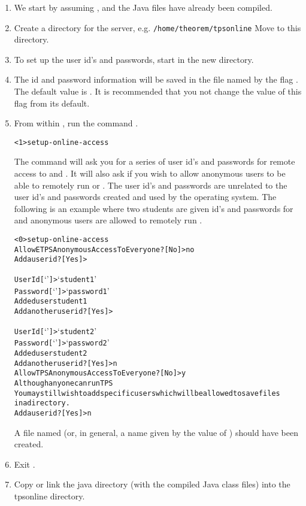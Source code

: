 \begin{enumerate}
\item We start by assuming {\ETPS}, {\TPS} and the Java files
have already been compiled.

\item Create a directory for the server, e.g.
{\tt /home/theorem/tpsonline}
Move to this directory.

\item To set up the user id's and passwords, start {\TPS}
in the new directory.

\item The id and password information will be saved in the file named by
the flag .  The default value
is .  It is recommended that
you not change the value of this flag from its default.

\item From within {\TPS}, run the command .
\begin{alltt}
<1>setup-online-access
\end{alltt}
The command  will ask you for
a series of user id's and passwords for remote access
to {\TPS} and {\ETPS}.  It will also ask if you
wish to allow anonymous users to be able to remotely run {\TPS} or {\ETPS}.
The user id's and passwords
are unrelated to the user id's and passwords created and used by the operating
system.  The following is an example where two students are given
id's and passwords for {\ETPS} and anonymous users are allowed to remotely
run {\TPS}.
\begin{alltt}
<0>setup-online-access
Allow ETPS Anonymous Access To Everyone? [No]>no
Add a userid?  [Yes]>

User Id  [`']>`student1'
Password  [`']>`password1'
Added user student1
Add another userid?  [Yes]>

User Id  [`']>`student2'
Password  [`']>`password2'
Added user student2
Add another userid?  [Yes]>n
Allow TPS Anonymous Access To Everyone? [No]>y
Although anyone can run TPS
You may still wish to add specific users which will be allowed to save files
in a directory.
Add a userid?  [Yes]>n
\end{alltt}
A file named  (or, in general,
a name given by the value of )
should have been created.

\item Exit {\TPS}.

\item Copy or link the java directory (with the compiled Java class files)
into the tpsonline directory.
\end{enumerate}

